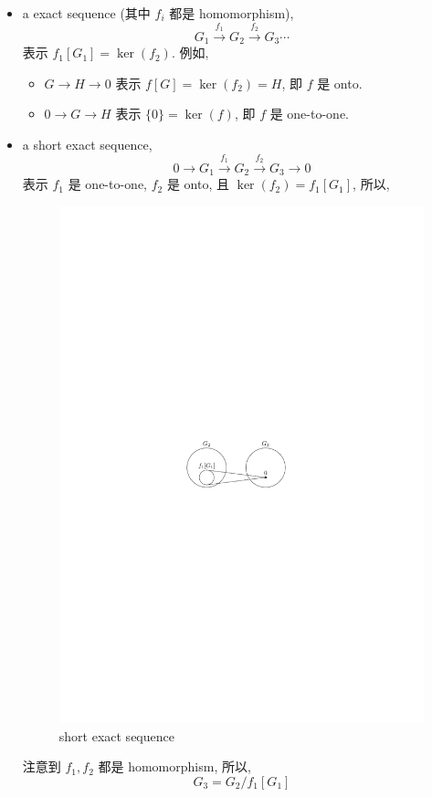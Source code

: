 \begin{itemize}
	\item a exact sequence (其中 $f_i$ 都是 homomorphism),
	\begin{equation}
		G_1 \overset{f_1}{\rightarrow} G_2 \overset{f_2}{\rightarrow} G_3 \cdots
	\end{equation}
	表示 $f_1[G_1] = \ker(f_2)$. 例如,
	\begin{itemize}
		\item $G \rightarrow H \rightarrow 0$ 表示 $f[G] = \ker(f_2) = H$, 即 $f$ 是 onto.
		
		\item $0 \rightarrow G \rightarrow H$ 表示 $\{0\} = \ker(f)$, 即 $f$ 是 one-to-one.
	\end{itemize}
	
	\item a short exact sequence,
	\begin{equation}
		0 \rightarrow G_1 \overset{f_1}{\rightarrow} G_2 \overset{f_2}{\rightarrow} G_3 \rightarrow 0
	\end{equation}
	表示 $f_1$ 是 one-to-one, $f_2$ 是 onto, 且 $\ker(f_2) = f_1[G_1]$, 所以,
	\begin{figure}[H]
		\centering
		\includegraphics[scale=1]{figures/short exact sequence.pdf}
		\caption{short exact sequence}
	\end{figure}
	
	注意到 $f_1, f_2$ 都是 homomorphism, 所以,
	\begin{equation}
		G_3 = G_2 / f_1[G_1]
	\end{equation}
\end{itemize}

